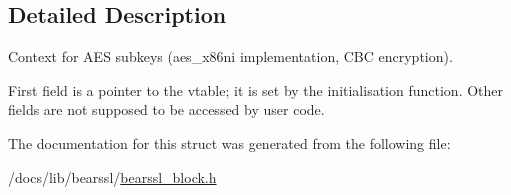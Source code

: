 \subsection{Detailed Description}
Context for A\+ES subkeys ({\ttfamily aes\+\_\+x86ni} implementation, C\+BC encryption). 

First field is a pointer to the vtable; it is set by the initialisation function. Other fields are not supposed to be accessed by user code. 

The documentation for this struct was generated from the following file\+:\begin{DoxyCompactItemize}
\item 
/docs/lib/bearssl/\hyperlink{bearssl__block_8h}{bearssl\+\_\+block.\+h}\end{DoxyCompactItemize}
